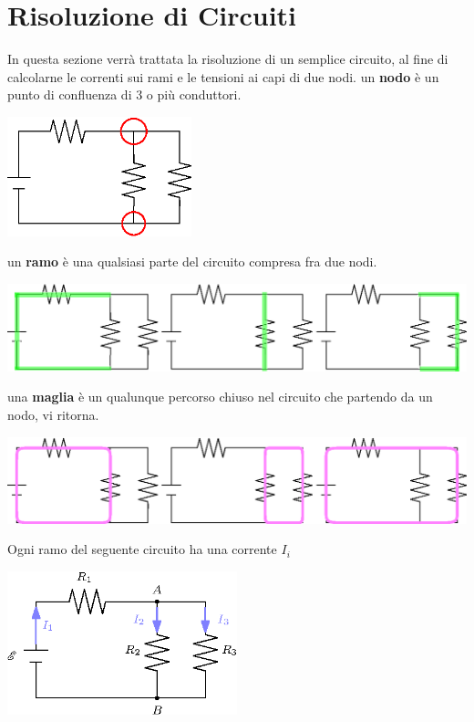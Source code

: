 \documentclass[10pt, letterpaper]{report}
\begin{document}
 \section{Risoluzione di Circuiti}
 In questa sezione verrà trattata la risoluzione di un semplice circuito, al fine di calcolarne le correnti sui rami e le tensioni ai capi di due nodi.\acc 
  un \textbf{nodo} è un punto di confluenza di 3 o più conduttori.\begin{center}
    \includegraphics[width=0.4\textwidth]{images/nodi.eps}
\end{center}
 un \textbf{ramo} è una qualsiasi parte del circuito compresa fra due nodi.\begin{center}
    \includegraphics[width=\textwidth]{images/rami.eps}
\end{center}
 una \textbf{maglia} è un qualunque percorso chiuso nel circuito che partendo da un nodo, vi ritorna.\begin{center}
    \includegraphics[width=\textwidth]{images/maglie.eps}
\end{center}
Ogni ramo del seguente circuito ha una corrente $I_i$
\begin{center}
    \includegraphics[width=0.5\textwidth]{images/circuitoRisolv.eps}
\end{center}
\end{document}
